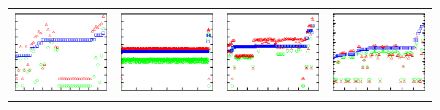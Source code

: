 \begin{figure}[t]
\centering
{}
\begin{tabular}{cccc}
\includegraphics{figs/static/storage_rpp64}&\includegraphics{figs/static/storage_rpp32}&\includegraphics{figs/static/storage_rpp16}&\includegraphics{figs/static/storage_rpp8}\vspace{-15pt}\\

\end{tabular}
\end{figure}
